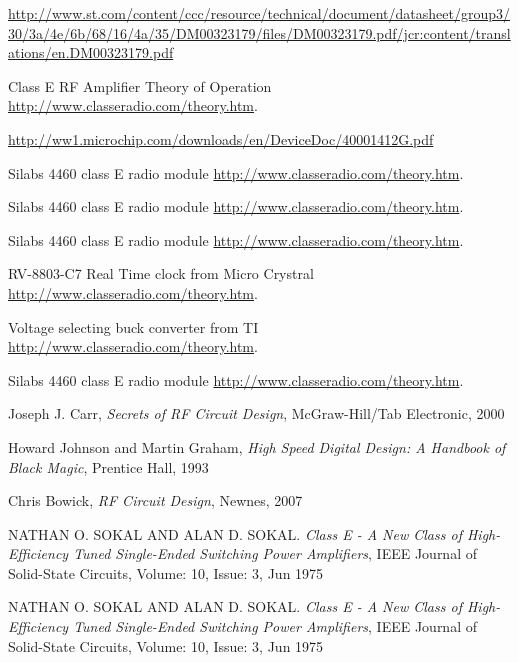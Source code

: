 \begin{thebibliography}{99}
\label{sec:ref}



	\url{http://www.st.com/content/ccc/resource/technical/document/datasheet/group3/30/3a/4e/6b/68/16/4a/35/DM00323179/files/DM00323179.pdf/jcr:content/translations/en.DM00323179.pdf}

	Class E RF Amplifier Theory of Operation
	\url{http://www.classeradio.com/theory.htm}.


	\url{http://ww1.microchip.com/downloads/en/DeviceDoc/40001412G.pdf}

	Silabs 4460 class E radio module
	\url{http://www.classeradio.com/theory.htm}.

	Silabs 4460 class E radio module
	\url{http://www.classeradio.com/theory.htm}.

	Silabs 4460 class E radio module
	\url{http://www.classeradio.com/theory.htm}.

	RV-8803-C7 Real Time clock from Micro Crystral
	\url{http://www.classeradio.com/theory.htm}.

	Voltage selecting buck converter from TI
	\url{http://www.classeradio.com/theory.htm}.

	Silabs 4460 class E radio module
	\url{http://www.classeradio.com/theory.htm}.



	Joseph J. Carr,  \emph{Secrets of RF Circuit Design}, McGraw-Hill/Tab Electronic, 2000

	Howard Johnson and Martin Graham,  \emph{High Speed Digital Design: A Handbook of Black Magic},  Prentice Hall, 1993

	Chris Bowick,  \emph{RF Circuit Design}, Newnes, 2007

	NATHAN O. SOKAL AND ALAN D. SOKAL. \emph{Class E - A New Class of High-Efficiency Tuned Single-Ended Switching Power Amplifiers},  IEEE Journal of Solid-State Circuits, Volume: 10, Issue: 3, Jun 1975 

	NATHAN O. SOKAL AND ALAN D. SOKAL. \emph{Class E - A New Class of High-Efficiency Tuned Single-Ended Switching Power Amplifiers},  IEEE Journal of Solid-State Circuits, Volume: 10, Issue: 3, Jun 1975 




\begin{comment}
\bibitem{overprotection}
	Overvoltage and Reverce-voltage Protection in Automotive Systems,
	Application note 760, \emph{Maxim integrated}, Apr 02, 2002, 
	\url{https://www.maximintegrated.com/en/app-notes/index.mvp/id/760}.
\end{comment}




\end{thebibliography}
